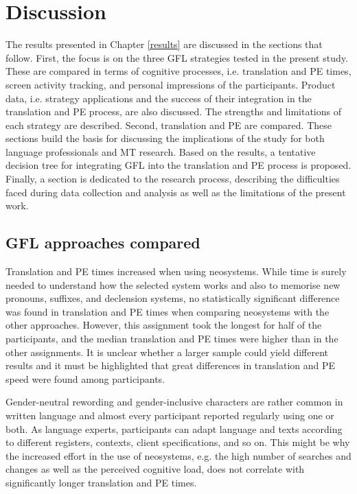 \chapter{Discussion} \label{Discussion}

The results presented in Chapter \ref{results} are discussed in the sections that follow. First, the focus is on the three GFL strategies tested in the present study. These are compared in terms of cognitive processes, i.e. translation and PE times, screen activity tracking, and personal impressions of the participants. Product data, i.e. strategy applications and the success of their integration in the translation and PE process, are also discussed. The strengths and limitations of each strategy are described. Second, translation and PE are compared. These sections build the basis for discussing the implications of the study for both language professionals and MT research. Based on the results, a tentative decision tree for integrating GFL into the translation and PE process is proposed. Finally, a section is dedicated to the research process, describing the difficulties faced during data collection and analysis as well as the limitations of the present work. 

\section{GFL approaches compared} \label{sec:strenghts/limitations}

Translation and PE times increased when using neosystems. While time is surely needed to understand how the selected system works and also to memorise new pronouns, suffixes, and declension systems, no statistically significant difference was found in translation and PE times when comparing neosystems with the other approaches. However, this assignment took the longest for half of the participants, and the median translation and PE times were higher than in the other assignments. It is unclear whether a larger sample could yield different results and it must be highlighted that great differences in translation and PE speed were found among participants.

Gender-neutral rewording and gender-inclusive characters are rather common in written language and almost every participant reported regularly using one or both. As language experts, participants can adapt language and texts according to different registers, contexts, client specifications, and so on. This might be why the increased effort in the use of neosystems, e.g. the high number of searches and changes as well as the perceived cognitive load, does not correlate with significantly longer translation and PE times.

